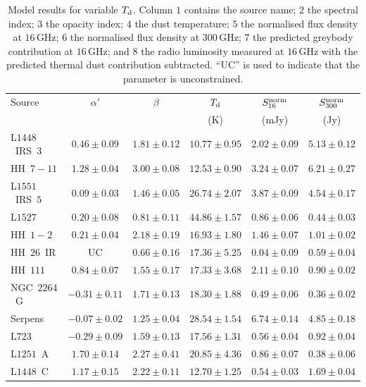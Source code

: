 \documentclass[9pt]{extarticle}   	%
\begin{document}
\vspace{10mm}
\begin{table}[h!]
\caption[AMI: model results for variable $T_{\rm d}$]{\small Model results for variable $T_{\rm d}$. Column $1$ contains the source name; $2$ the spectral index; $3$ the opacity index; $4$ the dust temperature; $5$ the normalised flux density at $16$\,GHz; $6$ the normalised flux density at $300$\,GHz; $7$ the predicted greybody contribution at $16$\,GHz; and $8$ the radio luminosity measured at $16$\,GHz with the predicted thermal dust contribution subtracted. ``UC'' is used to indicate that the parameter is unconstrained.} 
\label{tab:AMIsrcalpha2}
\begin{center}
\begin{tabular}{lccccc}
\hline\hline
Source & $\alpha'$ & $\beta$ & $T_{\rm d}$ & $S_{16}^{\rm norm}$ & $S_{300}^{\rm norm}$  \\
       & & & (K) & (mJy) & (Jy)  \\
\hline
L$1448$~IRS~$3$ & $0.46\pm0.09$ & $1.81\pm0.12$ & $10.77\pm0.95$ & $2.02\pm0.09$ & $5.13\pm0.12$  \\
HH~$7-11$ & $1.28\pm0.04$ & $3.00\pm0.08$ & $12.53\pm0.90$ & $3.24\pm0.07$ & $6.21\pm0.27$  \\
L$1551$~IRS~$5$ & $0.09\pm0.03$ & $1.46\pm0.05$ & $26.74\pm2.07$ & $3.87\pm0.09$ & $4.54\pm0.17$  \\
L$1527$ & $0.20\pm0.08$ & $0.81\pm0.11$ & $44.86\pm1.57$ & $0.86\pm0.06$ & $0.44\pm0.03$  \\
HH~$1-2$ & $0.21\pm0.04$ & $2.18\pm0.19$ & $16.93\pm1.80$ & $1.46\pm0.07$ & $1.01\pm0.02$  \\
HH~$26$~IR & UC & $0.66\pm0.16$ & $17.36\pm5.25$ & $0.04\pm0.09$ & $0.59\pm0.04$  \\
HH~$111$ & $0.84\pm0.07$ & $1.55\pm0.17$ & $17.33\pm3.68$ & $2.11\pm0.10$ & $0.90\pm0.02$  \\
NGC~$2264$~G & $-0.31\pm0.11$ & $1.71\pm0.13$ & $18.30\pm1.88$ & $0.49\pm0.06$ & $0.36\pm0.02$  \\
Serpens & $-0.07\pm0.02$ & $1.25\pm0.04$ & $28.54\pm1.54$ & $6.74\pm0.14$ & $4.85\pm0.18$  \\
L$723$ & $-0.29\pm0.09$ & $1.59\pm0.13$ & $17.56\pm1.31$ & $0.56\pm0.04$ & $0.92\pm0.04$  \\
L$1251$~A & $1.70\pm0.14$ & $2.27\pm0.41$ & $20.85\pm4.36$ & $0.86\pm0.07$ & $0.38\pm0.06$  \\
\hline
L$1448$~C & $1.17\pm0.15$ & $2.22\pm0.11$ & $12.70\pm1.25$ & $0.54\pm0.03$ & $1.69\pm0.04$  \\

\end{tabular}
\end{center}
\end{table}
\end{document}
